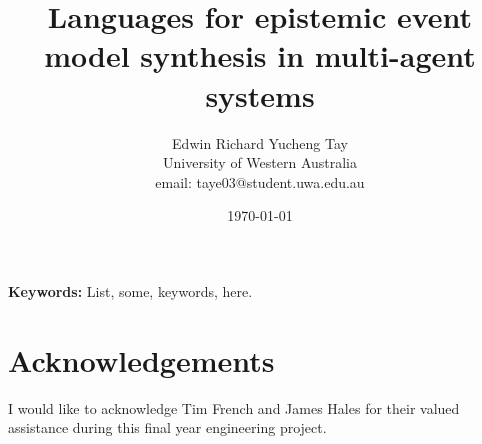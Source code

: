 \documentclass[12pt, a4paper, titlepage]{article}
\title{Languages for epistemic event model synthesis in multi-agent systems}
\author{Edwin Richard Yucheng Tay \\
University of Western Australia \\
email: taye03@student.uwa.edu.au }
\date{\today}
\numberwithin{equation}{section}
\begin{document}
\maketitle

\begin{abstract}


\end{abstract}

{\bf Keywords:} List, some, keywords, here.

\pagebreak

\tableofcontents









\section*{Acknowledgements}

I would like to acknowledge Tim French and James Hales for their valued assistance during this final
year engineering project.




\end{document}
